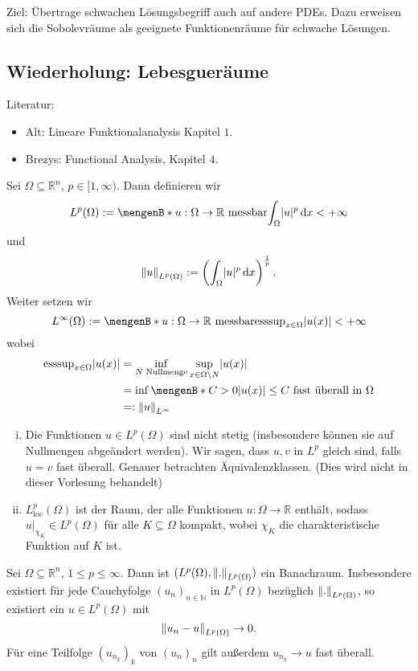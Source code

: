Ziel: Übertrage schwachen Lösungsbegriff auch auf andere PDEs. Dazu erweisen sich die Sobolevräume als geeignete Funktionenräume für schwache Lösungen.
\subsection{Wiederholung: Lebesgueräume} 
\label{sub:wiederholung_lebesgueraume}
Literatur:
\begin{itemize}
	\item Alt: Lineare Funktionalanalysis Kapitel $1$.
	\item Brezys: Functional Analysis, Kapitel $4$.
\end{itemize}

\begin{definition*}[$L^p$-Räume]
	Sei $\Omega \subseteq  \mathbb{R}^n$, $p \in [1,\infty)$. Dann definieren wir 
	\[
		L^p(\Omega) := \set[u: \Omega \to \mathbb{R} \text{ messbar}]{ \int_{\Omega}^{} \abs{u}^p \,\mathrm{d}x < + \infty}
	\]
	und 
	\[
		\norm{u}_{L^p(\Omega)} := \left( \int_{\Omega}^{}\abs{u}^p \,\mathrm{d}x \right)^{\frac{1}{p}}.
	\]
	Weiter setzen wir
	\[
		L^{\infty}(\Omega) := \set[u: \Omega \to \mathbb{R} \text{ messbar}]{\esssup_{x \in \Omega}\abs{u(x)} < + \infty}
	\]
	wobei
	\begin{align*}
		\esssup_{x \in \Omega} \abs{u(x)} &= \inf_{N \text{ Nullmenge}} \sup_{x \in \Omega \setminus N} \abs{u(x)} \\
		&= \inf \set[C >0]{\abs{u(x)}\leq C \text{ fast überall in }\Omega} \\
		&=: \norm{u}_{L^{\infty}}
	\end{align*}
\end{definition*}
\begin{bemerkung}
	\begin{enumerate}[(i)]
		\item Die Funktionen $u \in L^p(\Omega)$ sind nicht stetig (insbesondere können sie auf Nullmengen abgeändert werden). Wir sagen, dass $u,v$ in $L^p$
		gleich sind, falls $u=v$ fast überall. Genauer betrachten Äquivalenzklassen. (Dies wird nicht in dieser Vorlesung behandelt)
		\item $L^p_{\text{loc}}(\Omega)$ ist der Raum, der alle Funktionen $u: \Omega \to  \mathbb{R}$ enthält, sodass $u  \Big|_{\chi_K}^{} \in L^p(\Omega)$ 
		für alle $K \subseteq \Omega$ kompakt, wobei $\chi_K$ die charakteristische Funktion auf $K$ ist.
	\end{enumerate}
\end{bemerkung}
\begin{satz}[Vollständigkeit]
	Sei $\Omega \subseteq  \mathbb{R}^n$, $1 \leq p \leq \infty$. Dann ist $(L^p(\Omega),\norm{.}_{L^p(\Omega)})$ ein Banachraum. Insbesondere existiert für jede Cauchyfolge $(u_n)_{n \in \mathbb{N}}$ in $L^p(\Omega)$ bezüglich $\norm{.}_{L^p(\Omega)}$, so existiert ein $u \in L^p(\Omega)$ mit 
	\[
		\norm{u_n - u}_{L^p(\Omega)} \to 0.
	\]
	Für eine Teilfolge $(u_{n_k})_k$ von $(u_n)_n$ gilt außerdem $u_{n_k} \to u$ fast überall.
\end{satz}

